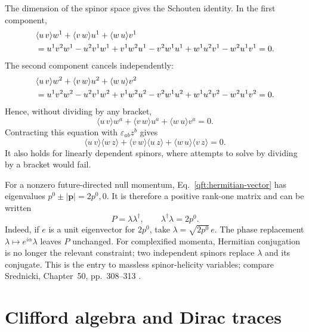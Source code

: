The dimension of the spinor space gives the Schouten identity. In the
first component,
\begin{align}
 &\langle u\,v\rangle w^1+\langle v\,w\rangle u^1
       +\langle w\,u\rangle v^1\notag\\
 &=u^1v^2w^1-u^2v^1w^1+v^1w^2u^1
   -v^2w^1u^1+w^1u^2v^1-w^2u^1v^1=0.
 \label{qft:schouten-component}
\end{align}
The second component cancels independently:
\begin{align}
 &\langle u\,v\rangle w^2+\langle v\,w\rangle u^2
       +\langle w\,u\rangle v^2\notag\\
 &=u^1v^2w^2-u^2v^1w^2+v^1w^2u^2
   -v^2w^1u^2+w^1u^2v^2-w^2u^1v^2=0.
 \label{qft:schouten-component-two}
\end{align}
Hence, without dividing by any bracket,
\begin{equation}\label{qft:schouten-vector}
 \langle u\,v\rangle w^a+\langle v\,w\rangle u^a
       +\langle w\,u\rangle v^a=0.
\end{equation}
Contracting this equation with $\varepsilon_{ab}z^b$ gives
\begin{equation}\label{qft:schouten-four}
 \langle u\,v\rangle\langle w\,z\rangle
 +\langle v\,w\rangle\langle u\,z\rangle
 +\langle w\,u\rangle\langle v\,z\rangle=0.
\end{equation}
It also holds for linearly dependent spinors, where attempts to solve by
dividing by a bracket would fail.

For a nonzero future-directed null momentum, Eq.~\eqref{qft:hermitian-vector}
has eigenvalues $p^0\pm|\mathbf p|=2p^0,0$. It is therefore a positive
rank-one matrix and can be written
\begin{equation}\label{qft:null-spinor-factorization}
 P=\lambda\lambda^\dagger,\qquad
 \lambda^\dagger\lambda=2p^0.
\end{equation}
Indeed, if $e$ is a unit eigenvector for $2p^0$, take
$\lambda=\sqrt{2p^0}\,e$. The phase replacement
$\lambda\mapsto e^{i\alpha}\lambda$ leaves $P$ unchanged.
For complexified momenta, Hermitian conjugation is no longer the relevant
constraint; two independent spinors replace $\lambda$ and its conjugate.
This is the entry to massless spinor-helicity variables; compare Srednicki,
Chapter~50, pp.~308--313 \cite{MSrednicki2007}.

\section{Clifford algebra and Dirac traces}\label{qft:sec:clifford}

